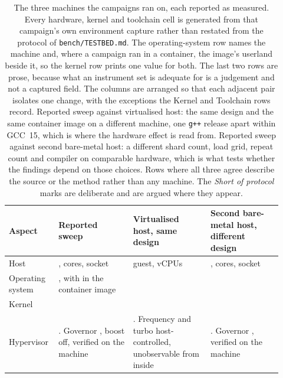 \documentclass[english,oneside,a4paper,censored,csm,software-track-2020]{HYthesisML}
\renewcommand{\arraystretch}{0.95}
\begin{document}
\begin{appendices}
\begin{table}[ht]
\centering
\small
\caption[The three measurement hosts]{The three machines the campaigns ran on, each reported as
measured. Every hardware, kernel and toolchain cell is generated from that campaign's own
environment capture rather than restated from the protocol of \texttt{bench/TESTBED.md}. The
operating-system row names the machine and, where a campaign ran in a container, the image's
userland beside it, so the kernel row prints one value for both. The last
two rows are prose, because what an instrument set is adequate for is a judgement and not a captured
field. The columns are arranged so that each
adjacent pair isolates one change, with the exceptions the Kernel and Toolchain rows record.
Reported sweep against virtualised host: the same design and the same container image on a
different machine, one \texttt{g++} release apart within GCC~15, which is where the hardware
effect is read from.
Reported sweep against second bare-metal host: a different shard count, load grid, repeat count and
compiler on comparable hardware, which is what tests whether the findings depend on those choices.
Rows where all three agree describe the source or the method rather than any machine. The
\emph{Short of protocol} marks are deliberate and are argued where they appear.\label{tab:testbed}}
\renewcommand{\arraystretch}{1.1}
\footnotesize
\begin{tabular}{@{}R{0.14\linewidth} R{0.26\linewidth} R{0.27\linewidth} R{0.25\linewidth}@{}}
\hline\hline
Aspect & Reported sweep & Virtualised host, same design & Second bare-metal host, different design \\
\hline
Host & \MainCpu{}, \MainCores{} cores, \MainSockets{} socket & \GuestCpu{} guest, \GuestCores{} vCPUs & \BmCpu{}, \BmCores{} cores, \BmSockets{} socket \\
Operating system & \MainHostDistro{}, with \MainDistro{} in the container image & \GuestDistro{} & \BmDistro{} \\
Kernel & \MainKernel{} & \GuestKernel{} & \BmKernel{} \\
Hypervisor & \MainVirt{}. Governor \MainGovernor{}, boost off, verified on the machine & \GuestVirt{}. Frequency and turbo host-controlled, unobservable from inside & \BmVirt{}. Governor \BmGovernor{}, verified on the machine \\

\end{tabular}
\end{table}
\end{appendices}
\end{document}
